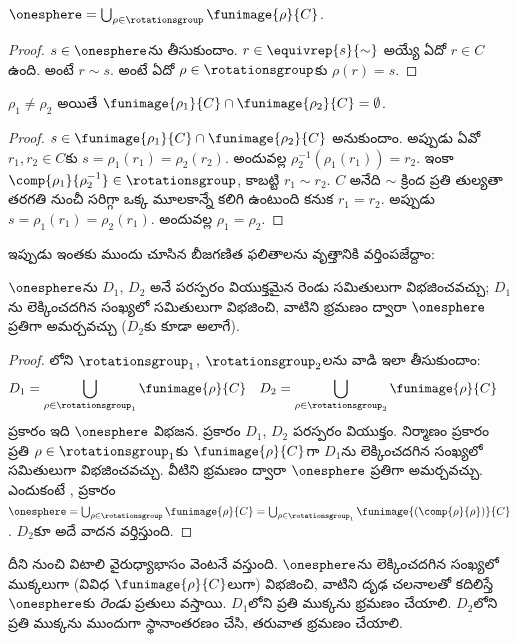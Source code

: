 \documentclass[../../../include/open-logic-section]{subfiles}
\begin{document}
\begin{lem}
$\onesphere = \bigcup_{\rho \in \rotationsgroup} \funimage{\rho}{C}$.
\end{lem}

\begin{proof}
$s \in \onesphere$ను తీసుకుందాం. $r \in
\equivrep{s}{\sim}$ అయ్యే ఏదో $r \in C$ ఉంది. అంటే $r \sim s$. అంటే ఏదో $\rho \in \rotationsgroup$కు $\rho(r) = s$.
\end{proof}

\begin{lem}
$\rho_1 \neq \rho_2$ అయితే $\funimage{\rho_1}{C} \cap \funimage{\rho_2}{C} = \emptyset$.
\end{lem}

\begin{proof}
$s \in \funimage{\rho_{1}}{C} \cap \funimage{\rho_{2}}{C}$ అనుకుందాం. అప్పుడు ఏవో $r_{1}, r_{2} \in C$కు $s = \rho_{1}(r_{1}) = \rho_{2}(r_{2})$. అందువల్ల $\rho^{-1}_2(\rho_1(r_1)) = r_2$. ఇంకా $\comp{\rho_1}{\rho^{-1}_2} \in \rotationsgroup$, కాబట్టి $r_{1} \sim
r_{2}$. $C$ అనేది $\sim$ క్రింద ప్రతి తుల్యతా తరగతి నుంచీ సరిగ్గా ఒక్క మూలకాన్నే కలిగి ఉంటుంది కనుక $r_1 = r_2$. అప్పుడు $s = \rho_1(r_1) = \rho_2(r_1)$. అందువల్ల $\rho_1 = \rho_2$.
\end{proof}

ఇప్పుడు ఇంతకు ముందు చూసిన బీజగణిత ఫలితాలను వృత్తానికి వర్తింపజేద్దాం:

\begin{lem}
$\onesphere$ను $D_{1}$, $D_{2}$ అనే పరస్పరం వియుక్తమైన రెండు సమితులుగా విభజించవచ్చు; $D_{1}$ను లెక్కించదగిన సంఖ్యలో సమితులుగా విభజించి, వాటిని భ్రమణం ద్వారా $\onesphere$ ప్రతిగా అమర్చవచ్చు ($D_{2}$కు కూడా అలాగే).
\end{lem}

\begin{proof}
లోని $\rotationsgroup_{1}$, $\rotationsgroup_{2}$లను వాడి ఇలా తీసుకుందాం:
\begin{align*}
	D_{1} &= \bigcup_{\rho \in \rotationsgroup_1} \funimage{\rho}{C} &
	D_{2} &= \bigcup_{\rho \in \rotationsgroup_2} \funimage{\rho}{C}
\end{align*}
 ప్రకారం ఇది $\onesphere$ విభజన.  ప్రకారం $D_1$, $D_2$ పరస్పరం వియుక్తం. నిర్మాణం ప్రకారం ప్రతి $\rho \in \rotationsgroup_1$కు $\funimage{\rho}{C}$గా $D_1$ను లెక్కించదగిన సంఖ్యలో సమితులుగా విభజించవచ్చు. వీటిని భ్రమణం ద్వారా $\onesphere$ ప్రతిగా అమర్చవచ్చు. ఎందుకంటే ,  ప్రకారం $\onesphere = \bigcup_{\rho \in
\rotationsgroup}\funimage{\rho}{C} = \bigcup_{\rho \in
\rotationsgroup_1}\funimage{(\comp{\rho}{\rho})}{C}$. $D_2$కూ అదే వాదన వర్తిస్తుంది.
\end{proof}
\noindent దీని నుంచి విటాలి వైరుధ్యాభాసం వెంటనే వస్తుంది. $\onesphere$ను లెక్కించదగిన సంఖ్యలో ముక్కలుగా (వివిధ $\funimage{\rho}{C}$లుగా) విభజించి, వాటిని దృఢ చలనాలతో కదిలిస్తే $\onesphere$కు \emph{రెండు} ప్రతులు వస్తాయి. $D_1$లోని ప్రతి ముక్కను భ్రమణం చేయాలి. $D_2$లోని ప్రతి ముక్కను ముందుగా స్థానాంతరణం చేసి, తరువాత భ్రమణం చేయాలి.
\end{document}
